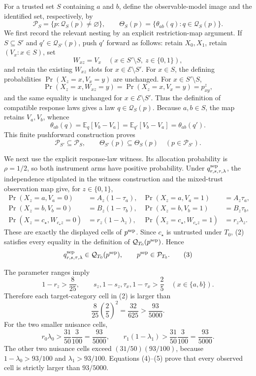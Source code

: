 For a trusted set \(S\) containing \(a\) and \(b\), define the observable-model image and the identified set, respectively, by
\[
 \mathcal P_S=\{p:\mathcal Q_S(p)\neq\varnothing\},
 \qquad
 \Theta_S(p)=\{\theta_{ab}(q):q\in\mathcal Q_S(p)\}.
\]
We first record the relevant nesting by an explicit restriction-map argument.  If \(S\subseteq S'\) and \(q'\in\mathcal Q_{S'}(p)\), push \(q'\) forward as follows: retain \(X_0,X_1\), retain \((V_x:x\in S)\), set
\[
 W_{xz}=V_x\quad(x\in S'\setminus S,\ z\in\{0,1\}),
\]
and retain the existing \(W_{xz}\) slots for \(x\in\mathcal E\setminus S'\).  For \(x\in S\), the defining probabilities \(\Pr(X_z=x,V_x=y)\) are unchanged.  For \(x\in S'\setminus S\),
\[
 \Pr(X_z=x,W_{xz}=y)=\Pr(X_z=x,V_x=y)=p^z_{xy},
\]
and the same equality is unchanged for \(x\in\mathcal E\setminus S'\).  Thus the definition of compatible response laws gives a law \(q\in\mathcal Q_S(p)\).  Because \(a,b\in S\), the map retains \(V_a,V_b\), whence
\[
 \theta_{ab}(q)=\mathbb E_q[V_b-V_a]
 =\mathbb E_{q'}[V_b-V_a]=\theta_{ab}(q').
\]
This finite pushforward construction proves
\[
 \mathcal P_{S'}\subseteq\mathcal P_S,
 \qquad
 \Theta_{S'}(p)\subseteq\Theta_S(p)\quad(p\in\mathcal P_{S'}).
 \tag{1}
\]

We next use the explicit response-law witness.  Its allocation probability is \(\rho=1/2\), so both instrument arms have positive probability.  Under \(q^{\rm sep}_{r,s,\tau,\lambda}\), the independence stipulated in the witness construction and the mixed-trust observation map give, for \(z\in\{0,1\}\),
\[
\begin{aligned}
 \Pr(X_z=a,V_a=0)&=A_z(1-\tau_a),&
 \Pr(X_z=a,V_a=1)&=A_z\tau_a,\\
 \Pr(X_z=b,V_b=0)&=B_z(1-\tau_b),&
 \Pr(X_z=b,V_b=1)&=B_z\tau_b,\\
 \Pr(X_z=c_\star,W_{c_\star z}=0)&=r_z(1-\lambda_z),&
 \Pr(X_z=c_\star,W_{c_\star z}=1)&=r_z\lambda_z.
\end{aligned}
\tag{2}
\]
These are exactly the displayed cells of \(p^{\rm sep}\).  Since \(c_\star\) is untrusted under \(T_0\), (2) satisfies every equality in the definition of \(\mathcal Q_{T_0}(p^{\rm sep})\).  Hence
\[
 q^{\rm sep}_{r,s,\tau,\lambda}\in\mathcal Q_{T_0}(p^{\rm sep}),
 \qquad p^{\rm sep}\in\mathcal P_{T_0}.
 \tag{3}
\]

The parameter ranges imply
\[
 1-r_z>\frac8{25},
 \qquad s_z,1-s_z,\tau_x,1-\tau_x>\frac25
 \quad(x\in\{a,b\}).
\]
Therefore each target-category cell in (2) is larger than
\[
 \frac8{25}\left(\frac25\right)^2
 =\frac{32}{625}>\frac{93}{5000}.
 \tag{4}
\]
For the two smaller nuisance cells,
\[
 r_0\lambda_0>\frac{31}{50}\frac3{100}=\frac{93}{5000},
 \qquad
 r_1(1-\lambda_1)>\frac{31}{50}\frac3{100}=\frac{93}{5000}.
 \tag{5}
\]
The other two nuisance cells exceed \((31/50)(93/100)\), because \(1-\lambda_0>93/100\) and \(\lambda_1>93/100\).  Equations (4)--(5) prove that every observed cell is strictly larger than \(93/5000\).

